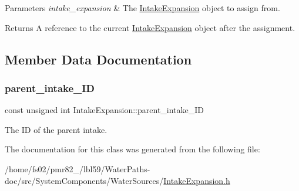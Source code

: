 \begin{DoxyParams}{Parameters}
{\em intake\+\_\+expansion} & The {\ttfamily \mbox{\hyperlink{classIntakeExpansion}{Intake\+Expansion}}} object to assign from.\\
\hline
\end{DoxyParams}
\begin{DoxyReturn}{Returns}
A reference to the current {\ttfamily \mbox{\hyperlink{classIntakeExpansion}{Intake\+Expansion}}} object after the assignment. 
\end{DoxyReturn}


\subsection{Member Data Documentation}
\mbox{\label{classIntakeExpansion_a93569405968a66226046e730e691615c}} 
\subsubsection{\texorpdfstring{parent\+\_\+intake\+\_\+\+ID}{parent\_intake\_ID}}
{\footnotesize\ttfamily const unsigned int Intake\+Expansion\+::parent\+\_\+intake\+\_\+\+ID}



The ID of the parent intake. 



The documentation for this class was generated from the following file\+:\begin{DoxyCompactItemize}
\item 
/home/fs02/pmr82\+\_/lbl59/\+Water\+Paths-\/doc/src/\+System\+Components/\+Water\+Sources/\mbox{\hyperlink{IntakeExpansion_8h}{Intake\+Expansion.\+h}}\end{DoxyCompactItemize}
